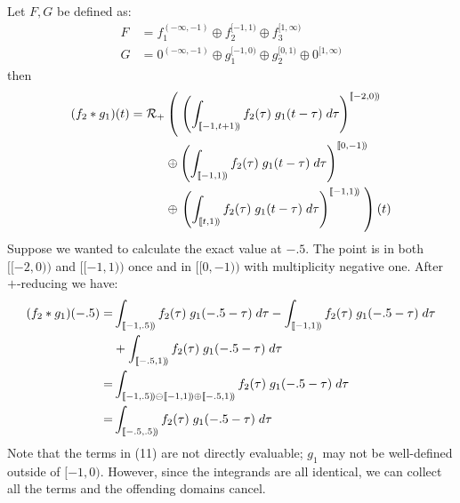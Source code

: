 \documentclass{letter}
\begin{document}
	Let $F, G$ be defined as:
	\begin{align}
		F &= f_1^{(-\infty, -1)} \oplus f_2^{[-1,1)} \oplus f_3^{[1,\infty)} \\
		G &= 0^{(-\infty, -1)} \oplus g_1^{[-1, 0)} \oplus g_2^{[0,1)} \oplus 0^{[1,\infty)}	
	\end{align}	
	then 
	\begin{align}
	(f_2 * g_1)(t) = 
		\mathcal{R}_+ &\left( \; \left( 
			\int_{[\![-1,t+1)\!)} f_2(\tau) \; g_1(t-\tau) \; d\tau \right)^{[\![-2,0)\!)} 
				\right. \notag \\ &\oplus \left( 
			\int_{[\![-1,1)\!)} f_2(\tau) \; g_1(t-\tau) \; d\tau \right)^{[\![0,-1)\!)} 
				\notag \\ &\oplus \left. \left( 
			\int_{[\![t,1)\!)} f_2(\tau) \; g_1(t-\tau) \; d\tau \right)^{[\![-1,1)\!)} 
				\; \right)(t)
	\end{align}
	Suppose we wanted to calculate the exact value at $-.5$. 
	The point is in both $[\![-2,0)\!)$ and $[\![-1, 1)\!)$ once and in $[\![0,-1)\!)$ with multiplicity negative one.
	After $+$-reducing we have:
	\begin{align}
	(f_2 * g_1)(-.5) =& 
		\int_{[\![-1, .5)\!)} f_2(\tau) \; g_1(-.5-\tau) \; d\tau - 
		\int_{[\![-1, 1)\!)} f_2(\tau) \; g_1(-.5-\tau) \; d\tau \notag \\
		& + \int_{[\![-.5, 1)\!)} f_2(\tau) \; g_1(-.5-\tau) \; d\tau \\
		=& \int_{[\![-1, .5)\!) \ominus [\![-1,1)\!) \oplus [\![-.5,1)\!)} f_2(\tau) \; g_1(-.5-\tau) \; d\tau \\
		=& \int_{[\![-.5,.5)\!)} f_2(\tau) \; g_1(-.5-\tau) \; d\tau
	\end{align}
	Note that the terms in (11) are not directly evaluable; $g_1$ may not be well-defined outside of $[-1,0)$.
	However, since the integrands are all identical, we can collect all the terms and the offending domains cancel.
	
\end{document}
